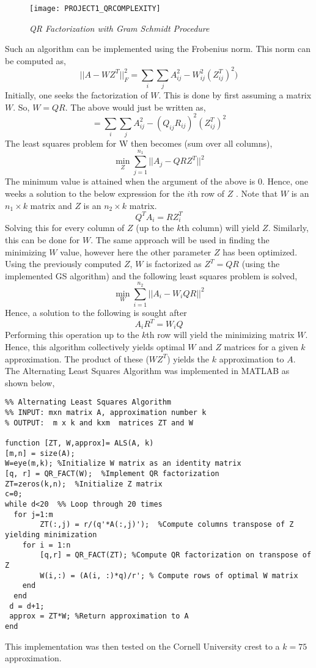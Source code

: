 \documentclass{article}
\begin{document}
 \begin{wrapfigure}{r}{0.55\textwidth}
\texttt{[image: PROJECT1\_QRCOMPLEXITY]}
\caption{\emph{QR Factorization with Gram Schmidt Procedure}}
\end{wrapfigure}
Such an algorithm can be implemented using the Frobenius norm. This norm can be computed as, 
$$||A-WZ^{T}||_{F}^{2} = \sum_{i}\sum_{j} A_{ij}^{2}-W_{ij}^{2}(Z_{ij}^{T})^{2} )$$ 
Initially, one seeks the factorization of $W$. This is done by first assuming a matrix $W$. So, $W=QR$. The  above would just be written as, 
$$ = \sum_{i}\sum_{j} A_{ij}^{2}-(Q_{ij}R_{ij})^{2} (Z_{ij}^{T})^{2}$$   
The least squares problem for W then becomes (sum over all columns),  
$$\min _{Z} \sum_{j=1}^{n_{1}} ||A_{j} -  QRZ^{T} ||^{2}   $$ 
The minimum value is attained when the argument of the above is 0. Hence,  one weeks a solution to the below expression for the $i$th row of $Z$ . Note that $W$ is an $n_{1} \times k$ matrix and $Z$ is an $n_{2} \times k$ matrix.  
$$Q^{T}A_{i} = RZ^{T}_{i}  $$     
Solving this for every column of $Z$ (up to the $k$th column) will yield $Z$. 
Similarly, this can be done for $W$. The same approach will be used in finding the minimizing $W$ value, however here the other parameter $Z$ has been optimized. Using the previously computed $Z$,  $W$ is factorized as $ Z^{T} = QR$ (using the implemented GS algorithm) and the following least squares problem is solved, 
$$\min _{W} \sum_{i=1}^{n_{2}} ||A_{i} - W_{i}QR ||^{2}   $$ 
Hence, a solution to the following is sought after
$$A_{i}R^{T} =W_{i}Q$$
Performing this operation up to the $k$th row will yield the minimizing matrix $W$. Hence, this algorithm collectively yields optimal $W$ and $Z$ matrices for a given $k$ approximation. The product of these ($WZ^{T}$) yields the $k$ approximation to $A$.     
The Alternating Least Squares Algorithm was implemented in MATLAB as shown below, 
\begin{lstlisting}
%% Alternating Least Squares Algorithm 
%% INPUT: mxn matrix A, approximation number k 
% OUTPUT:  m x k and kxm  matrices ZT and W  

function [ZT, W,approx]= ALS(A, k)
[m,n] = size(A); 
W=eye(m,k); %Initialize W matrix as an identity matrix 
[q, r] = QR_FACT(W);  %Implement QR factorization
ZT=zeros(k,n);  %Initialize Z matrix 
c=0; 
while d<20  %% Loop through 20 times  
  for j=1:m 
        ZT(:,j) = r/(q'*A(:,j)');  %Compute columns transpose of Z yielding minimization
    for i = 1:n  
        [q,r] = QR_FACT(ZT); %Compute QR factorization on transpose of Z  
        W(i,:) = (A(i, :)*q)/r'; % Compute rows of optimal W matrix 
    end 
  end 
 d = d+1;  
 approx = ZT*W; %Return approximation to A 
end 
 \end{lstlisting}
This implementation was then tested on the Cornell University crest to a $k=75$ approximation.\newline \newline 
\end{document}
